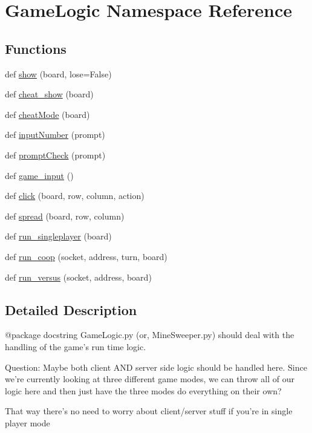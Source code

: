 \hypertarget{namespace_game_logic}{}\section{Game\+Logic Namespace Reference}
\label{namespace_game_logic}
\subsection*{Functions}
\begin{DoxyCompactItemize}
\item 
def \hyperlink{namespace_game_logic_afacbe6e69e6b939244d8c5f0aba5ff34}{show} (board, lose=False)
\item 
def \hyperlink{namespace_game_logic_ab23e4dd8920efb5dc428f599388dbc70}{cheat\+\_\+show} (board)
\item 
def \hyperlink{namespace_game_logic_ac701e0d880a5e8c09baf395c2f5d2a19}{cheat\+Mode} (board)
\item 
def \hyperlink{namespace_game_logic_a9e9b9869e1330923fbe2a0cb04b6c50d}{input\+Number} (prompt)
\item 
def \hyperlink{namespace_game_logic_aa208d35c45f200a28a8503ad891fd391}{prompt\+Check} (prompt)
\item 
def \hyperlink{namespace_game_logic_a4476538b080b2e54e2cf920d47385884}{game\+\_\+input} ()
\item 
def \hyperlink{namespace_game_logic_a8565813a63f94dd1e8325cbc3b2015bb}{click} (board, row, column, action)
\item 
def \hyperlink{namespace_game_logic_ae766be9cec703745c4f97f4f85a79dfc}{spread} (board, row, column)
\item 
def \hyperlink{namespace_game_logic_aa19068ecba13ba5dae3258c28138983d}{run\+\_\+singleplayer} (board)
\item 
def \hyperlink{namespace_game_logic_afc48c64dfaba7c18f642ab23e8e3a3bf}{run\+\_\+coop} (socket, address, turn, board)
\item 
def \hyperlink{namespace_game_logic_ae210e41405e4a019624993e6eec6b99a}{run\+\_\+versus} (socket, address, board)
\end{DoxyCompactItemize}


\subsection{Detailed Description}
\begin{DoxyVerb}@package docstring
GameLogic.py (or, MineSweeper.py) should deal with the handling of the game's
run time logic.

Question: Maybe both client AND server side logic should be handled here. Since
we're currently looking at three different game modes, we can throw all of our
logic here and then just have the three modes do everything on their own?

That way there's no need to worry about client/server stuff if you're in
single player mode
\end{DoxyVerb}
 


